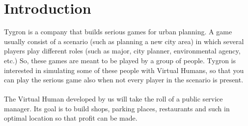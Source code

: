 \section{Introduction}

Tygron is a company that builds serious games for urban planning.
A game usually consist of a scenario (such as planning a new city area) in which several players play different roles (such as major, city planner, environmental agency, etc.)
So, these games are meant to be played by a group of people.
Tygron is interested in simulating some of these people with Virtual Humans, so that you can play the serious game also when not every player in the scenario is present. 
\\
\\
The Virtual Human developed by us will take the roll of a public service manager. Its goal is to build shops, parking places, restaurants and such in optimal location so that profit can be made.




\newpage